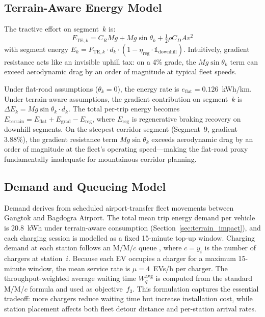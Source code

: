 \documentclass[conference]{IEEEtran}
\begin{document}
\subsection{Terrain-Aware Energy Model}
\label{sec:energy}

The tractive effort on segment~$k$ is:
\begin{equation}
F_{\text{TE},k} = C_R M g + M g \sin\theta_k + \tfrac{1}{2}\rho C_D A v^2
\label{eq:tractive}
\end{equation}
\noindent with segment energy $E_k = F_{\text{TE},k} \cdot d_k \cdot (1 - \eta_{\text{reg}} \cdot \mathbb{1}_{\text{downhill}})$. Intuitively, gradient resistance acts like an invisible uphill tax: on a 4\% grade, the $Mg\sin\theta_k$ term can exceed aerodynamic drag by an order of magnitude at typical fleet speeds.

Under flat-road assumptions ($\theta_k = 0$), the energy rate is $e_{\text{flat}} = 0.126$~kWh/km. Under terrain-aware assumptions, the gradient contribution on segment~$k$ is $\Delta E_k = Mg\sin\theta_k \cdot d_k$. The total per-trip energy becomes $E_{\text{terrain}} = E_{\text{flat}} + E_{\text{grad}} - E_{\text{reg}}$, where $E_{\text{reg}}$ is regenerative braking recovery on downhill segments. On the steepest corridor segment (Segment~9, gradient 3.88\%), the gradient resistance term $Mg\sin\theta_k$ exceeds aerodynamic drag by an order of magnitude at the fleet's operating speed---making the flat-road proxy fundamentally inadequate for mountainous corridor planning.

\subsection{Demand and Queueing Model}
\label{sec:queueing}

Demand derives from scheduled airport-transfer fleet movements between Gangtok and Bagdogra Airport. The total mean trip energy demand per vehicle is 20.8~kWh under terrain-aware consumption (Section~\ref{sec:terrain_impact}), and each charging session is modelled as a fixed 15-minute top-up window. Charging demand at each station follows an M/M/$c$ queue \cite{19}, where $c = y_i$ is the number of chargers at station~$i$. Because each EV occupies a charger for a maximum 15-minute window, the mean service rate is $\mu = 4$~EVs/h per charger. The throughput-weighted average waiting time $W_q^{\text{avg}}$ is computed from the standard M/M/$c$ formula and used as objective~$f_3$. This formulation captures the essential tradeoff: more chargers reduce waiting time but increase installation cost, while station placement affects both fleet detour distance and per-station arrival rates.
\end{document}
